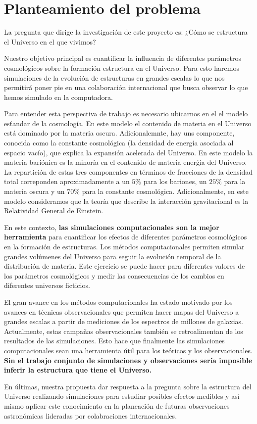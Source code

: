 

\section{Planteamiento del problema}

La pregunta que dirige la investigaci\'on de este proyecto es: ¿Cómo
se estructura el Universo en el que vivimos?

Nuestro objetivo principal es cuantificar la influencia de diferentes
par\'ametros cosmol\'ogicos sobre la formaci\'on estructura en el Universo.
Para esto haremos simulaciones de la evolución de estructuras en
grandes escalas lo que nos permitirá poner pie en una colaboración
internacional que busca observar lo que hemos simulado en la
computadora.

Para entender esta perspectiva de trabajo es necesario ubicarnos en el
el modelo es\'tandar de la cosmolog\'ia. 
En este modelo el contenido de materia en el Universo est\'a dominado
por la materia oscura. 
Adicionalemnte, hay uns componente, conocida como la constante cosmol\'ogica (la
densidad de energ\'ia asociada al espacio vac\'io), que explica la
expansi\'on acelerada del Universo. 
En este modelo la materia bari\'onica es la minor\'ia en el contenido
de materia ener\'gia del Universo. 
La repartici\'on de estas tres componentes en t\'erminos de fracciones
de la densidad total correponden aproximadamente a un $5\%$ para los
bariones, un $25\%$ para la materia oscura y un $70\%$ para la
constante cosmol\'ogica. 
Adicionalmente, en este modelo consideramos que la teor\'ia que
describe la interacci\'on gravitacional es la Relatividad General de
Einstein. 

En este contexto, {\bf las simulaciones computacionales son la mejor
herramienta} para cuantificar los efectos de diferentes par\'ametros
cosmol\'ogicos en la formaci\'on de estructuras. 
Los  m\'etodos computacionales permiten simular grandes vol\'umenes
del Universo para seguir la evoluci\'on temporal de la distribuci\'on
de materia. 
Este ejercicio se puede hacer para diferentes valores de los
par\'ametros cosmol\'ogicos y  medir las consecuencias de los cambios
en diferentes universos ficticios.  

El gran avance en los m\'etodos computacionales ha estado motivado por
los avances en t\'ecnicas observacionales que permiten hacer mapas del
Universo a grandes escalas a partir de mediciones de los espectros de
millones de galaxias.   
Actualmente, estas campa\~nas observacionales tambi\'en se
retroalimentan de los resultados de las simulaciones. 
Esto hace que finalmente las simulaciones computacionales sean una
herramienta \'util para los te\'oricos y los observacionales. {\bf Sin el
trabajo conjunto de simulaciones y observaciones ser\'ia imposible
inferir la estructura que tiene el Universo.}

En \'ultimas, nuestra propuesta dar respuesta a la pregunta sobre la
estructura del Universo realizando simulaciones para estudiar posibles
efectos medibles y as\'i mismo aplicar este conocimiento en la
planeaci\'on de futuras observaciones astron\'omicas lideradas por
colabraciones internacionales. 
